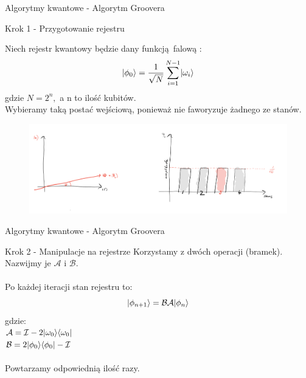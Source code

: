 \documentclass{beamer}
\DeclarePairedDelimiter\bra{\langle}{\rvert}
\DeclarePairedDelimiter\ket{\lvert}{\rangle}
\begin{document}
	\begin{frame}{Algorytmy kwantowe - Algorytm Groovera}
		\begin{block}{Krok 1 - Przygotowanie rejestru}

			Niech rejestr kwantowy będzie dany funkcją falową : 
			$$\ket{\phi_{0}} = \frac{1}{\sqrt{N}}\sum\limits_{i=1}^{N-1}\ket{\omega_{i}} $$
			gdzie $N = 2^{n},$ a n to ilość kubitów.\\ \vspace{0.4em}
			Wybieramy taką postać wejściową, ponieważ nie faworyzuje żadnego ze stanów. 
		\end{block}
		\begin{center}
			\begin{figure}
				\includegraphics[scale=0.5]{media/groverINIT.png}
			\end{figure}
		\end{center}
	\end{frame}
	
	
	
	\begin{frame}{Algorytmy kwantowe - Algorytm Groovera}
		\begin{block}{Krok 2 - Manipulacje na rejestrze}
			\vspace{0.5em}
			Korzystamy z dwóch operacji (bramek). Nazwijmy je $\mathcal{A}$ i $\mathcal{B}$.\\~\\
			Po każdej iteracji stan rejestru to:
			$$\ket{\phi_{n+1}} =\mathcal{B}\mathcal{A}\ket{\phi_{n}}$$
			\quad gdzie:\\
			\centering
			$\mathcal{A} = \mathcal{I} - 2\ket{\omega_{0}}\bra{\omega_{0}}$\vspace{0.5em}\\
			$\mathcal{B} = 2\ket{\phi_{0}}\bra{\phi_{0}} - \mathcal{I} $\\~\\
			Powtarzamy odpowiednią ilość razy.
			
			\vspace{0.5em}
		\end{block}
	\end{frame}
	
\end{document}
